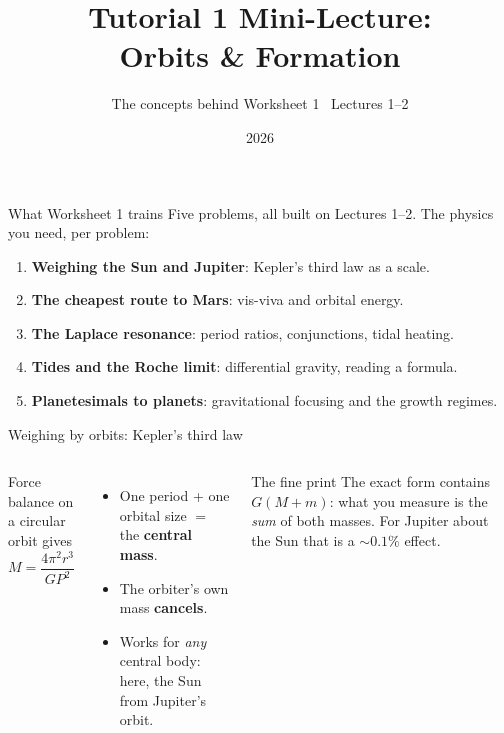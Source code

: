 \documentclass[aspectratio=169, 11pt]{beamer}
\title[T1 mini-lecture: Orbits \& Formation]{Tutorial 1 Mini-Lecture:\\Orbits \& Formation}
\subtitle{The concepts behind Worksheet 1 \textbullet\ Lectures 1--2}
\author{}
\institute{Kapteyn Astronomical Institute\\University of Groningen}
\date{2026}
\begin{document}
\begin{frame}
  \titlepage
\end{frame}

\begin{frame}{What Worksheet 1 trains}
  Five problems, all built on Lectures 1--2. The physics you need, per problem:
  \vskip6pt\relax
  \begin{enumerate}
    \item \textbf{Weighing the Sun and Jupiter}: Kepler's third law as a scale.
    \item \textbf{The cheapest route to Mars}: vis-viva and orbital energy.
    \item \textbf{The Laplace resonance}: period ratios, conjunctions, tidal heating.
    \item \textbf{Tides and the Roche limit}: differential gravity, reading a formula.
    \item \textbf{Planetesimals to planets}: gravitational focusing and the growth regimes.
  \end{enumerate}
  \vskip6pt\relax
\end{frame}

\begin{frame}{Weighing by orbits: Kepler's third law}
  \begin{columns}[T]
    Force balance on a circular orbit gives
    \[
      \boxed{M = \frac{4\pi^2 r^3}{G P^2}}
    \]
    \begin{itemize}
      \item One period + one orbital size $=$ the \textbf{central mass}.
      \item The orbiter's own mass \textbf{cancels}.
      \item Works for \emph{any} central body: here, the Sun from Jupiter's orbit.
    \end{itemize}

    \begin{block}{The fine print}
      The exact form contains $G(M + m)$: what you measure is the \emph{sum} of both masses.
      For Jupiter about the Sun that is a $\sim 0.1\%$ effect.
    \end{block}
  \end{columns}
  \vskip2pt\relax
\end{frame}
\end{document}
